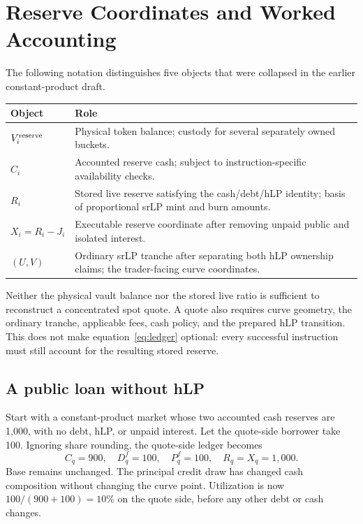 \section{Reserve Coordinates and Worked Accounting}
\label{app:accounting}

The following notation distinguishes five objects that were collapsed in the earlier constant-product draft.
\begin{center}\small
\begin{tabularx}{\linewidth}{@{}lX@{}}
\toprule
Object & Role \\
\midrule
$V_i^{\rm reserve}$ & Physical token balance; custody for several separately owned buckets. \\
$C_i$ & Accounted reserve cash; subject to instruction-specific availability checks. \\
$R_i$ & Stored live reserve satisfying the cash/debt/hLP identity; basis of proportional srLP mint and burn amounts. \\
$X_i=R_i-J_i$ & Executable reserve coordinate after removing unpaid public and isolated interest. \\
$(U,V)$ & Ordinary srLP tranche after separating both hLP ownership claims; the trader-facing curve coordinates. \\
\bottomrule
\end{tabularx}\end{center}

Neither the physical vault balance nor the stored live ratio is sufficient to reconstruct a concentrated spot quote. A quote also requires curve geometry, the ordinary tranche, applicable fees, cash policy, and the prepared hLP transition. This does not make equation~\eqref{eq:ledger} optional: every successful instruction must still account for the resulting stored reserve.

\subsection{A public loan without hLP}

Start with a constant-product market whose two accounted cash reserves are 1,000, with no debt, hLP, or unpaid interest. Let the quote-side borrower take 100. Ignoring share rounding, the quote-side ledger becomes
\[
C_q=900,\quad D_q^f=100,\quad P_q^f=100,\quad
R_q=X_q=1{,}000.
\]
Base remains unchanged. The principal credit draw has changed cash composition without changing the curve point. Utilization is now $100/(900+100)=10\%$ on the quote side, before any other debt or cash changes.

